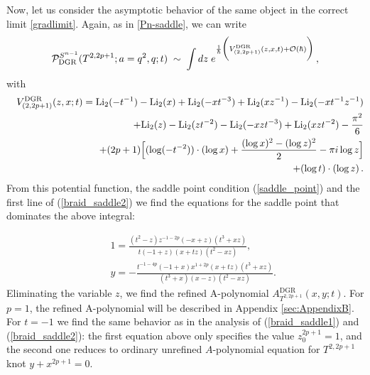 \documentclass[hyper,letterpaper]{JHEP3}
\newcommand{\be}{\begin{equation}}
\newcommand{\ee}{\end{equation}}
\renewcommand{\P}{{\cal P}}
\begin{document}
Now, let us consider the asymptotic behavior of the same object in the correct limit \eqref{gradlimit}.
Again, as in \eqref{Pn-saddle}, we can write
\be
\P_{\text{DGR}}^{S^{n-1}}(T^{2,2p+1};a=q^2,q;t)
\; \sim \; \int dz\; e^{\frac{1}{\hbar} \biggl(V_{(2,2p+1)}^{\text{DGR}}(z,x,t) +{\cal O}(\hbar)\biggr)} \,,
\ee
with
\begin{eqnarray}
&&V_{(2,2p+1)}^{\text{DGR}}(z,x;t)=
{\rm Li}_2(-t^{-1}) - {\rm Li}_2(x) + {\rm Li}_2(-xt^{-3}) +
{\rm Li}_2(xz^{-1}) - {\rm Li}_2(-xt^{-1}z^{-1})
\nonumber \\
&&\quad\quad\quad\quad\quad\quad\quad\;
+ {\rm Li}_2(z) - {\rm Li}_2(zt^{-2}) - {\rm Li}_2(-x zt^{-3})
+ {\rm Li}_2(x zt^{-2})-\frac{\pi^2}{6}
\nonumber \\
&&\quad\quad\quad\quad\quad\quad\quad\;
+  (2p+1)\Bigl[ (\log (-t^{-2}))\cdot(\log x) +
    \frac{(\log x)^2 - (\log z)^2}{2}-\pi i\log z\Bigr]
\nonumber \\
&& \quad\quad\quad\quad\quad\quad\quad\;
+(\log t)\cdot  (\log z) \,.
\end{eqnarray}
{}From this potential function, the saddle point condition (\ref{saddle_point}) and the first line of (\ref{braid_saddle2}) we find the equations
for the saddle point that dominates the above integral:

\begin{eqnarray}
&&1=\frac{ (t^2 - z) z^{-1 - 2 p} (-x + z) (t^3 + x z)}{t (-1 + z) (x + t z) (t^2 - x z)},
\nonumber \\
&&y=-\frac{ t^{-1 - 4 p} (-1 + x) x^{1 + 2 p} (x + t z) (t^3 + x z)}
{(t^3 + x) (x - z) (t^2 - x z)}.
\label{Saddle_DGR2}
\end{eqnarray}
Eliminating the variable $z$, we find the refined A-polynomial $A^{\text{DGR}}_{T^{2,2p+1}} (x,y;t)$.
For $p=1$, the refined A-polynomial will be described in Appendix \ref{sec:AppendixB}. For $t=-1$ we find the same behavior as in the analysis of  (\ref{braid_saddle1}) and (\ref{braid_saddle2}): the first equation above only specifies the value $z_0^{2p+1}=1$, and the second one reduces to ordinary unrefined $A$-polynomial equation for $T^{2,2p+1}$ knot $y+x^{2p+1}=0$.
\end{document}
